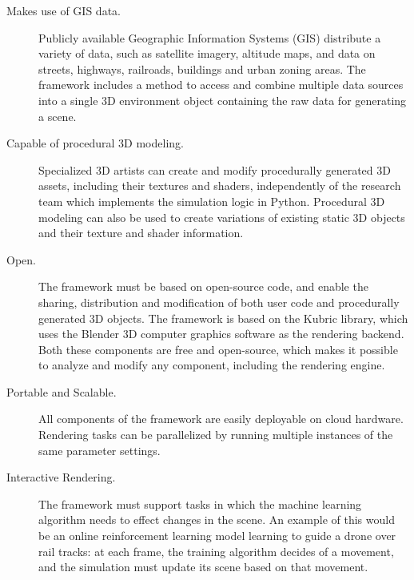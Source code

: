 \begin{description}
    \item[Makes use of GIS data.] Publicly available Geographic Information Systems (GIS) distribute a variety of data, such as satellite imagery, altitude maps, and data on streets, highways, railroads, buildings and urban zoning areas. The framework includes a method to access and combine multiple data sources into a single 3D environment object containing the raw data for generating a scene.
    \item[Capable of procedural 3D modeling.] Specialized 3D artists can create and modify procedurally generated 3D assets, including their textures and shaders, independently of the research team which implements the simulation logic in Python. Procedural 3D modeling can also be used to create variations of existing static 3D objects and their texture and shader information.
    \item[Open.]  The framework must be based on open-source code, and enable the sharing, distribution and modification of both user code and procedurally generated 3D objects. The framework is based on the Kubric\cite{greff2021kubric} library, which uses the Blender 3D computer graphics software as  the rendering backend. Both these components are free and open-source, which makes it possible to analyze and modify any component, including the rendering engine.
    \item[Portable and Scalable.]  All components of the framework are easily deployable on cloud hardware. Rendering tasks can be parallelized by running multiple instances of the same parameter settings.
    \item[Interactive Rendering.] The framework must support tasks in which the machine learning algorithm needs to effect changes in the scene. An example of this would be an online reinforcement learning model learning to guide a drone over rail tracks: at each frame, the training algorithm decides of a movement, and the simulation must update its scene based on that movement.
\end{description}
